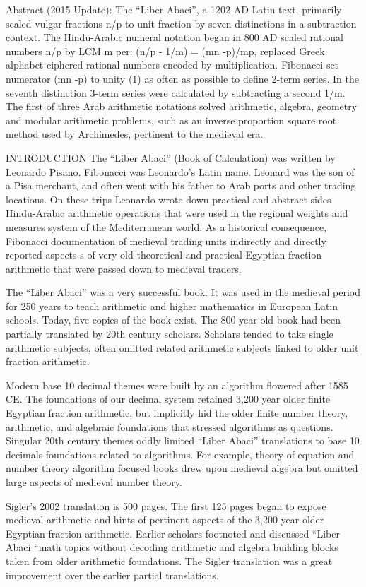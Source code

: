 \documentclass[12pt]{article}
\begin{document}
Abstract (2015 Update):
The “Liber Abaci”, a 1202 AD Latin text, primarily scaled vulgar fractions n/p to unit fraction by seven distinctions in a subtraction context. The Hindu-Arabic numeral notation began in 800 AD scaled rational numbers n/p by LCM m per: (n/p - 1/m) = (mn -p)/mp, replaced Greek alphabet ciphered rational numbers encoded by multiplication. Fibonacci set numerator (mn -p) to unity (1) as often as possible to define 2-term series. In the seventh distinction 3-term series were calculated by subtracting a second 1/m. The first of three Arab arithmetic notations solved arithmetic, algebra, geometry and modular arithmetic problems, such as an inverse proportion square root method used by Archimedes, pertinent to the medieval era.

INTRODUCTION
The “Liber Abaci” (Book of Calculation) was written by Leonardo Pisano. Fibonacci was Leonardo's Latin name. Leonard was the son of a Pisa merchant, and often went with his father to Arab ports and other trading locations. On these trips Leonardo wrote down practical and abstract sides Hindu-Arabic arithmetic operations that were used in the regional weights and measures system of the Mediterranean world. As a historical consequence, Fibonacci documentation of medieval trading units indirectly and directly reported  aspects s of very old theoretical and practical Egyptian fraction arithmetic that were  passed down to medieval  traders.

The “Liber Abaci” was a very successful book. It was used in the medieval period for 250 years to teach arithmetic and higher mathematics in European Latin schools. Today, five copies of the book exist. The 800 year old book had been partially translated by 20th century scholars.  Scholars tended to take single arithmetic subjects, often omitted related arithmetic subjects linked to older unit fraction arithmetic. 

Modern base 10 decimal themes were built by an algorithm flowered after 1585 CE. The foundations of our decimal system retained 3,200 year older finite Egyptian fraction arithmetic, but implicitly hid the older finite number theory, arithmetic, and algebraic foundations that stressed algorithms as questions. Singular 20th century themes oddly limited “Liber Abaci” translations to base 10 decimals foundations related to algorithms. For example, theory of equation and number theory algorithm focused books drew upon medieval algebra but omitted large aspects of medieval number theory. 

Sigler’s 2002 translation is 500 pages. The first 125 pages began to expose medieval arithmetic and hints of pertinent aspects of the 3,200 year older Egyptian fraction arithmetic. Earlier scholars footnoted and discussed “Liber Abaci “math topics without decoding arithmetic and algebra building blocks taken from older arithmetic foundations. The Sigler translation was a great improvement over the earlier partial translations.
\end{document}

